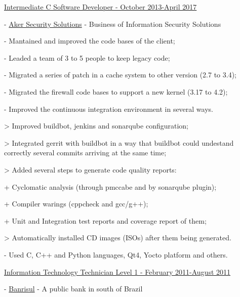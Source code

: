 \documentclass[12pt,oneside,a4paper]{article}
\begin{document}
\begin{compactitem}
	\item \underline{Intermediate C Software Developer - October 2013-April 2017}
    \begin{compactitem}
      \item [-] \href{http://www.aker.com.br}{Aker Security Solutions} - Business of Information Security Solutions
      \item [-] Mantained and improved the code bases of the client;
      \item [-] Leaded a team of 3 to 5 people to keep legacy code;
      \item [-] Migrated a series of patch in a cache system to other version (2.7 to 3.4);
      \item [-] Migrated the firewall code bases to support a new kernel (3.17 to 4.2);
      \item [-] Improved the continuous integration environment in several ways.
      \begin{compactitem}
        \item [>] Improved buildbot, jenkins and sonarqube configuration;
        \item [>] Integrated gerrit with buildbot in a way that buildbot could undestand
        \\ correctly several commits arriving at the same time;
        \item [>] Added several steps to generate code quality reports:
        \begin{compactitem}
          \item [+] Cyclomatic analysis (through pmccabe and by sonarqube plugin);
          \item [+] Compiler warings (cppcheck and gcc/g++);
          \item [+] Unit and Integration test reports and coverage report of them;
        \end{compactitem}
        \item [>] Automatically installed CD images (ISOs) after them being generated.
      \end{compactitem}
      \item [-] Used C, C++ and Python languages, Qt4, Yocto platform and others.
    \end{compactitem}
	\item \underline{Information Technology Technician Level 1 - February 2011-August 2011}
    \begin{compactitem}
      \item [-] \href{http://www.banrisul.com.br}{Banrisul} - A public bank in south of Brazil

\end{compactitem}
\end{compactitem}
\end{document}
